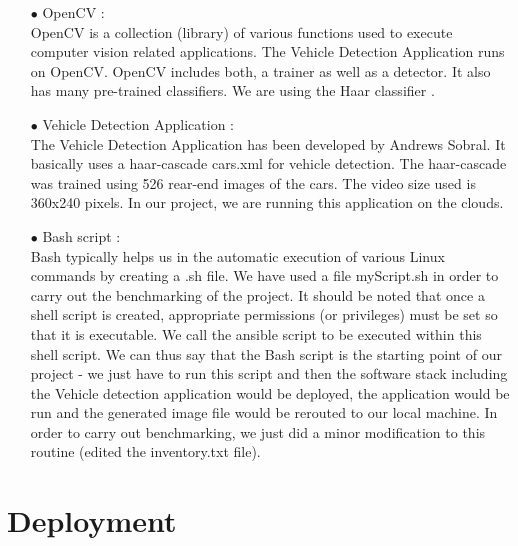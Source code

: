 \documentclass[9pt,twocolumn,twoside]{../../styles/osajnl}
\begin{document}
\begin{itemize}
\item[$\bullet$] OpenCV \cite{OpenCV}: \\
OpenCV is a collection (library) of various functions used to execute
computer vision related applications.  The Vehicle Detection
Application runs on OpenCV.  OpenCV includes both, a trainer as well
as a detector.  It also has many pre-trained classifiers.  We are
using the Haar classifier \cite{haar-cascade}.

\item[$\bullet$] Vehicle Detection Application \cite{vehicle-detection-application}: \\
The Vehicle Detection Application has been developed by Andrews
Sobral.  It basically uses a haar-cascade cars.xml for vehicle
detection.  The haar-cascade was trained using 526 rear-end images of
the cars.  The video size used is 360x240 pixels.  In our project, we
are running this application on the clouds.

\item[$\bullet$] Bash script \cite{Bash-script}:\\
Bash typically helps us in the automatic execution of various Linux commands by creating a .sh file.  We have used a file myScript.sh in order to carry out the benchmarking of the project.  It should be noted that once a shell script is created, appropriate permissions (or privileges) must be set so that it is executable.  We call the ansible script to be executed within this shell script.  We can thus say that the Bash script is the starting point of our project - we just have to run this script and then the software stack including the Vehicle detection application would be deployed, the application would be run and the generated image file would be rerouted to our local machine.  In order to carry out benchmarking, we just did a minor modification to this routine (edited the inventory.txt file).

\end{itemize}

\section{Deployment}
\end{document}
